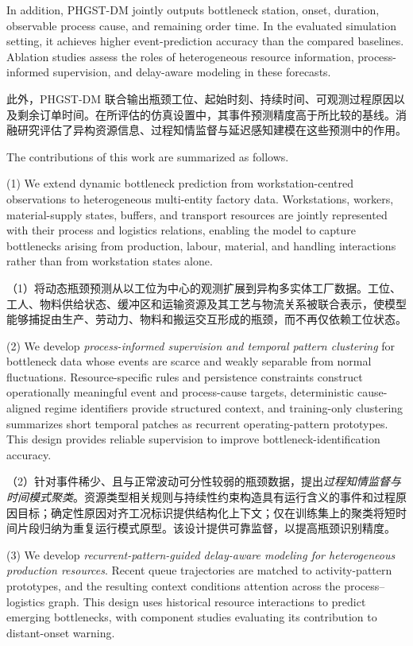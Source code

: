 \documentclass[a4paper,fleqn]{cas-dc}
\newcommand{\zhpara}[1]{%
  \par\begingroup\small\color{black!72}\noindent #1\par\endgroup}
\begin{document}
In addition, PHGST-DM jointly outputs bottleneck station, onset, duration, observable process cause, and remaining order time. In the evaluated simulation setting, it achieves higher event-prediction accuracy than the compared baselines. Ablation studies assess the roles of heterogeneous resource information, process-informed supervision, and delay-aware modeling in these forecasts.

\zhpara{此外，PHGST-DM 联合输出瓶颈工位、起始时刻、持续时间、可观测过程原因以及剩余订单时间。在所评估的仿真设置中，其事件预测精度高于所比较的基线。消融研究评估了异构资源信息、过程知情监督与延迟感知建模在这些预测中的作用。}


The contributions of this work are summarized as follows.

(1) We extend dynamic bottleneck prediction from workstation-centred observations to heterogeneous multi-entity factory data. Workstations, workers, material-supply states, buffers, and transport resources are jointly represented with their process and logistics relations, enabling the model to capture bottlenecks arising from production, labour, material, and handling interactions rather than from workstation states alone.

\zhpara{（1）将动态瓶颈预测从以工位为中心的观测扩展到异构多实体工厂数据。工位、工人、物料供给状态、缓冲区和运输资源及其工艺与物流关系被联合表示，使模型能够捕捉由生产、劳动力、物料和搬运交互形成的瓶颈，而不再仅依赖工位状态。}


(2) We develop \emph{process-informed supervision and temporal pattern clustering} for bottleneck data whose events are scarce and weakly separable from normal fluctuations. Resource-specific rules and persistence constraints construct operationally meaningful event and process-cause targets, deterministic cause-aligned regime identifiers provide structured context, and training-only clustering summarizes short temporal patches as recurrent operating-pattern prototypes. This design provides reliable supervision to improve bottleneck-identification accuracy.

\zhpara{（2）针对事件稀少、且与正常波动可分性较弱的瓶颈数据，提出\emph{过程知情监督与时间模式聚类}。资源类型相关规则与持续性约束构造具有运行含义的事件和过程原因目标；确定性原因对齐工况标识提供结构化上下文；仅在训练集上的聚类将短时间片段归纳为重复运行模式原型。该设计提供可靠监督，以提高瓶颈识别精度。}


(3) We develop \emph{recurrent-pattern-guided delay-aware modeling for heterogeneous production resources}. Recent queue trajectories are matched to activity-pattern prototypes, and the resulting context conditions attention across the process--logistics graph. This design uses historical resource interactions to predict emerging bottlenecks, with component studies evaluating its contribution to distant-onset warning.
\end{document}
